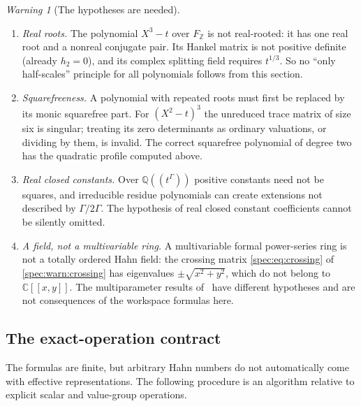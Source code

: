 \documentclass[11pt,a4paper]{article}
\numberwithin{equation}{section}
\theoremstyle{definition}
\theoremstyle{remark}
\newtheorem{warning}[warning]{Warning}
\newcommand{\C}{\mathbb C}
\newcommand{\Q}{\mathbb Q}
\newcommand{\Z}{\mathbb Z}
\begin{document}
\begin{warning}[The hypotheses are needed]\label{spec:hank:warn:hypotheses}
\begin{enumerate}[label=(\alph*)]
\item \emph{Real roots.} The polynomial $X^3-t$ over $F_\Z$ is not
real-rooted: it has one real root and a nonreal conjugate pair. Its Hankel
matrix is not positive definite (already $h_2=0$), and its complex splitting
field requires $t^{1/3}$. So no ``only half-scales'' principle for all
polynomials follows from this section.
\item \emph{Squarefreeness.} A polynomial with repeated roots must first be
replaced by its monic squarefree part. For $(X^2-t)^3$ the unreduced trace
matrix of size six is singular; treating its zero determinants as ordinary
valuations, or dividing by them, is invalid. The correct squarefree
polynomial of degree two has the quadratic profile computed above.
\item \emph{Real closed constants.} Over $\Q((t^\Gamma))$ positive constants
need not be squares, and irreducible residue polynomials can create
extensions not described by $\Gamma/2\Gamma$. The hypothesis of real closed
constant coefficients cannot be silently omitted.
\item \emph{A field, not a multivariable ring.} A multivariable formal
power-series ring is not a totally ordered Hahn field: the crossing matrix
\eqref{spec:eq:crossing} of \cref{spec:warn:crossing} has eigenvalues
$\pm\sqrt{x^2+y^2}$, which do not belong to $\C[[x,y]]$. The multiparameter
results of~\cite{PR,DLLZ} have different hypotheses and are not consequences
of the workspace formulas here.
\end{enumerate}
\end{warning}

\subsection{The exact-operation contract}
\label{spec:hank:sub:contract}

The formulas are finite, but arbitrary Hahn numbers do not automatically come
with effective representations. The following procedure is an algorithm
relative to explicit scalar and value-group operations.
\end{document}
